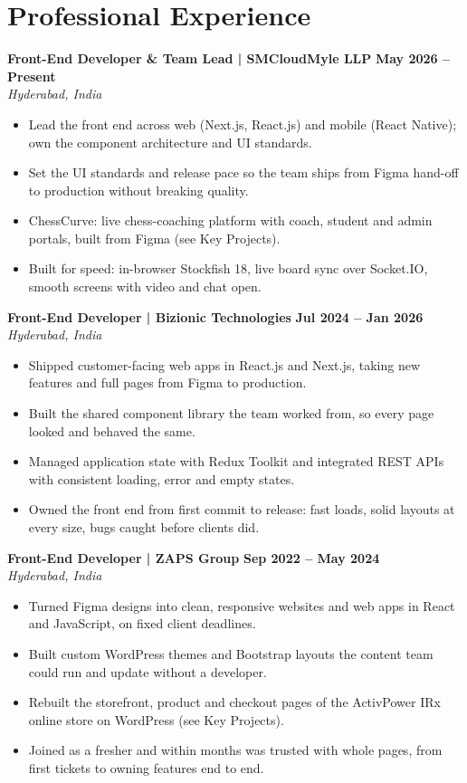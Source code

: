 \documentclass[a4paper,10pt]{article}
\begin{document}
\section{Professional Experience}

\noindent\textbf{Front-End Developer \& Team Lead | SMCloudMyle LLP} \hfill \textbf{May 2026 -- Present} \\
\textit{Hyderabad, India}
\begin{itemize}
    \item Lead the front end across web (Next.js, React.js) and mobile (React Native); own the component architecture and UI standards.
    \item Set the UI standards and release pace so the team ships from Figma hand-off to production without breaking quality.
    \item ChessCurve: live chess-coaching platform with coach, student and admin portals, built from Figma (see Key Projects).
    \item Built for speed: in-browser Stockfish 18, live board sync over Socket.IO, smooth screens with video and chat open.
\end{itemize}

\vspace{2pt}

\noindent\textbf{Front-End Developer | Bizionic Technologies} \hfill \textbf{Jul 2024 -- Jan 2026} \\
\textit{Hyderabad, India}
\begin{itemize}
    \item Shipped customer-facing web apps in React.js and Next.js, taking new features and full pages from Figma to production.
    \item Built the shared component library the team worked from, so every page looked and behaved the same.
    \item Managed application state with Redux Toolkit and integrated REST APIs with consistent loading, error and empty states.
    \item Owned the front end from first commit to release: fast loads, solid layouts at every size, bugs caught before clients did.
\end{itemize}

\vspace{2pt}

\noindent\textbf{Front-End Developer | ZAPS Group} \hfill \textbf{Sep 2022 -- May 2024} \\
\textit{Hyderabad, India}
\begin{itemize}
    \item Turned Figma designs into clean, responsive websites and web apps in React and JavaScript, on fixed client deadlines.
    \item Built custom WordPress themes and Bootstrap layouts the content team could run and update without a developer.
    \item Rebuilt the storefront, product and checkout pages of the ActivPower IRx online store on WordPress (see Key Projects).
    \item Joined as a fresher and within months was trusted with whole pages, from first tickets to owning features end to end.
\end{itemize}
\end{document}
